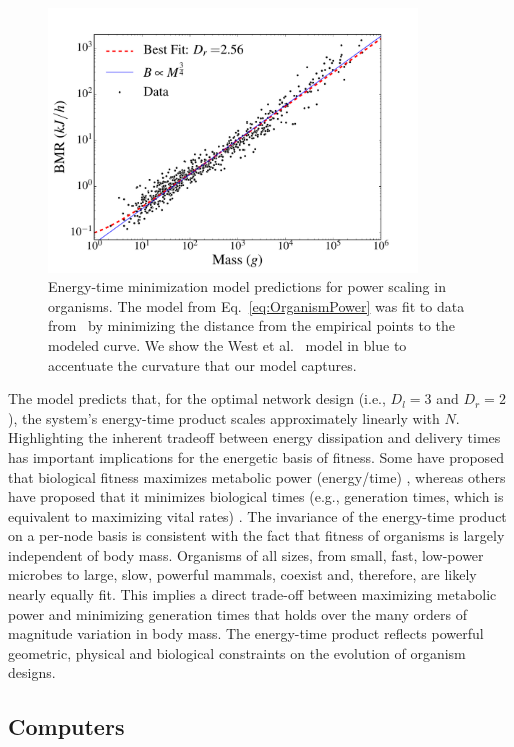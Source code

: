 \documentclass[12pt]{article}
\begin{document}
\begin{figure}[!h] \centering
  \includegraphics[height=70mm]{Figures/OrganismsPowerScaling.pdf}

  \caption{Energy-time minimization model predictions for power
    scaling in organisms. The model from Eq.~\ref{eq:OrganismPower}
    was fit to data from~\cite{kolokotrones2010curvature} by minimizing the distance
    from the empirical points to the modeled curve. We show the West et al.~\cite{west97} model in blue to
    accentuate the curvature that our model captures.
    }
\label{fig:OrganismsPowerScaling}
\end{figure}


The model predicts that, for the optimal network design (i.e., $D_l=3$  and
$D_r=2$), the system's energy-time product scales approximately linearly with $N$. Highlighting the inherent tradeoff between energy dissipation and delivery times 
has important implications for the energetic basis of fitness.  Some have proposed that biological fitness
maximizes metabolic power (energy/time) \cite{lotka56, odum71}, whereas others
have proposed that it minimizes biological times (e.g., generation times, which
is equivalent to maximizing vital rates) \cite{lindstedt81, sibly91}. The
invariance of the energy-time product on a per-node basis is consistent with the fact that fitness
of organisms is largely independent of body mass.  Organisms of all sizes, from
small, fast, low-power microbes to large, slow, powerful mammals, coexist and,
therefore, are likely nearly equally fit.  This implies a direct trade-off
between maximizing metabolic power and minimizing generation times that holds
over the many orders of magnitude variation in body mass.  The energy-time
product reflects powerful geometric, physical and biological constraints on the
evolution of organism designs.


\subsection{Computers}
\label{sec:computers}
\end{document}
